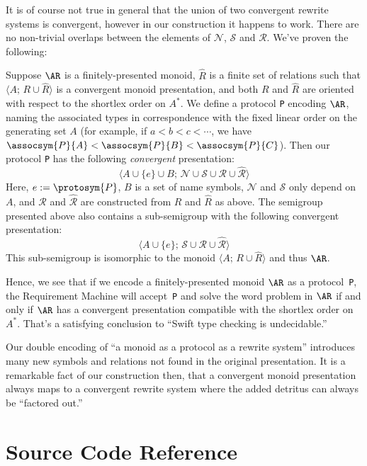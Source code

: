 \documentclass[../generics]{subfiles}
\begin{document}
\begin{example}
It is of course not true in general that the union of two convergent rewrite systems is convergent, however in our construction it happens to work. There are no non-trivial overlaps between the elements of $\mathcal{N}$, $\mathcal{S}$ and $\mathcal{R}$. We've proven the following:
\begin{theorem}
Suppose $\AR$ is a finitely-presented monoid, $\hat{R}$ is a finite set of relations such that $\langle A;\,R\cup\hat{R}\rangle$ is a convergent monoid presentation, and both $R$ and $\hat{R}$ are oriented with respect to the shortlex order on $A^*$. We define a protocol \texttt{P} encoding $\AR$, naming the associated types in correspondence with the fixed linear order on the generating set $A$ (for example, if $a<b<c<\cdots$, we have $\assocsym{P}{A}<\assocsym{P}{B}<\assocsym{P}{C}$). Then our protocol \texttt{P} has the following \emph{convergent} presentation:
\[\langle A\cup\{e\}\cup B;\,\mathcal{N}\cup\mathcal{S}\cup\mathcal{R}\cup\hat{\mathcal{R}}\rangle\]
Here, $e:=\protosym{P}$, $B$ is a set of name symbols, $\mathcal{N}$ and $\mathcal{S}$ only depend on $A$, and $\mathcal{R}$ and $\hat{\mathcal{R}}$ are constructed from $R$ and $\hat{R}$ as above. The semigroup presented above also contains a sub-semigroup with the following convergent presentation:
\[\langle A\cup\{e\};\,\mathcal{S}\cup\mathcal{R}\cup\hat{\mathcal{R}}\rangle\]
This sub-semigroup is isomorphic to the monoid $\langle A;\,R\cup\hat{R}\rangle$ and thus $\AR$.
\end{theorem}

Hence, we see that if we encode a finitely-presented monoid $\AR$ as a protocol~\texttt{P}, the Requirement Machine will accept~\texttt{P} and solve the word problem in $\AR$ if and only if $\AR$ has a convergent presentation compatible with the shortlex order on $A^*$. That's a satisfying conclusion to ``Swift type checking is undecidable.''

Our double encoding of ``a monoid as a protocol as a rewrite system'' introduces many new symbols and relations not found in the original presentation. It is a remarkable fact of our construction then, that a convergent monoid presentation always maps to a convergent rewrite system where the added detritus can always be ``factored out.''
\end{example}

\section{Source Code Reference}\label{completion sourceref}
\end{document}
